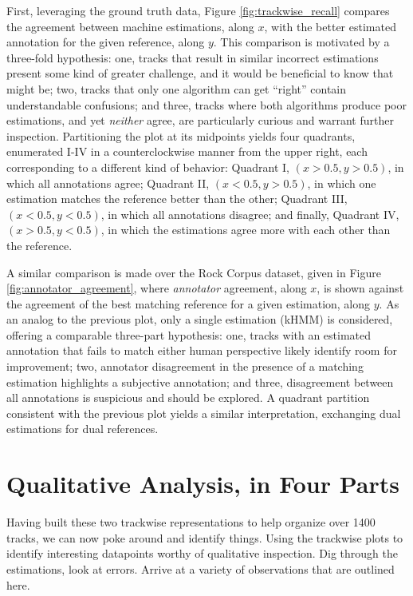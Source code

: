 \documentclass{article}
\begin{document}
First, leveraging the ground truth data, Figure \ref{fig:trackwise_recall} compares the agreement between machine estimations, along $x$, with the better estimated annotation for the given reference, along $y$.
This comparison is motivated by a three-fold hypothesis:
one, tracks that result in similar incorrect estimations present some kind of greater challenge, and it would be beneficial to know that might be;
two, tracks that only one algorithm can get ``right'' contain understandable confusions;
and three, tracks where both algorithms produce poor estimations, and yet \emph{neither} agree, are particularly curious and warrant further inspection.
Partitioning the plot at its midpoints yields four quadrants, enumerated I-IV in a counterclockwise manner from the upper right, each corresponding to a different kind of behavior:
Quadrant I, $(x > 0.5, y > 0.5)$, in which all annotations agree;
Quadrant II, $(x < 0.5, y > 0.5)$, in which one estimation matches the reference better than the other;
Quadrant III, $(x < 0.5, y < 0.5)$, in which all annotations disagree;
and finally, Quadrant IV, $(x > 0.5, y < 0.5)$, in which the estimations agree more with each other than the reference.


A similar comparison is made over the Rock Corpus dataset, given in Figure \ref{fig:annotator_agreement}, where \emph{annotator} agreement, along $x$, is shown against the agreement of the best matching reference for a given estimation, along $y$.
As an analog to the previous plot, only a single estimation (kHMM) is considered, offering a comparable three-part hypothesis:
one, tracks with an estimated annotation that fails to match either human perspective likely identify room for improvement;
two, annotator disagreement in the presence of a matching estimation highlights a subjective annotation;
and three, disagreement between all annotations is suspicious and should be explored.
A quadrant partition consistent with the previous plot yields a similar interpretation, exchanging dual estimations for dual references.


\section{Qualitative Analysis, in Four Parts}
\label{sec:analysis}

Having built these two trackwise representations to help organize over 1400 tracks, we can now poke around and identify things.
Using the trackwise plots to identify interesting datapoints worthy of qualitative inspection.
Dig through the estimations, look at errors.
Arrive at a variety of observations that are outlined here.
\end{document}
